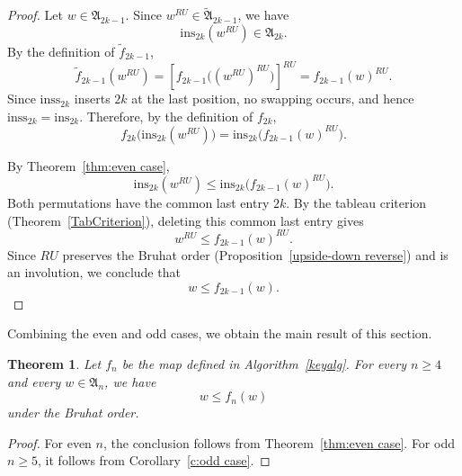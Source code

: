 \documentclass[12pt]{amsart}
\newtheorem{thm}{Theorem}[section]
\theoremstyle{definition}
\numberwithin{equation}{section}
\newcommand{\ins}[1]{\mathrm{ins}_{#1}}
\newcommand{\inss}[1]{\mathrm{inss}_{#1}}
\begin{document}
\begin{proof}
Let $w\in\mathfrak A_{2k-1}$. Since
$w^{RU}\in\widetilde{\mathfrak A}_{2k-1}$, we have
\begin{equation*}
\ins{2k}(w^{RU})\in\mathfrak A_{2k}.
\end{equation*}
By the definition of $\widetilde f_{2k-1}$,
\begin{equation*}
\widetilde f_{2k-1}(w^{RU})
=
\left[f_{2k-1}\bigl((w^{RU})^{RU}\bigr)\right]^{RU}
=
f_{2k-1}(w)^{RU}.
\end{equation*}
Since $\inss{2k}$ inserts $2k$ at the last position, no swapping occurs,
and hence $\inss{2k}=\ins{2k}$. Therefore, by the definition of
$f_{2k}$,
\begin{equation*}
f_{2k}\bigl(\ins{2k}(w^{RU})\bigr)
=
\ins{2k}\bigl(f_{2k-1}(w)^{RU}\bigr).
\end{equation*}

By Theorem~\ref{thm:even case},
\begin{equation*}
\ins{2k}(w^{RU})
\leq
\ins{2k}\bigl(f_{2k-1}(w)^{RU}\bigr).
\end{equation*}
Both permutations have the common last entry $2k$. By the tableau criterion (Theorem~\ref{TabCriterion}), deleting this common last entry gives
\begin{equation*}
w^{RU}\leq f_{2k-1}(w)^{RU}.
\end{equation*}
Since $RU$ preserves the Bruhat order (Proposition~\ref{upside-down reverse}) and is an involution, we conclude
that
\begin{equation*}
w\leq f_{2k-1}(w).
\end{equation*}
\end{proof}

Combining the even and odd cases, we obtain the main result of this section.

\begin{thm}\label{t:Bruhat balance case}
Let $f_n$ be the map defined in Algorithm~\ref{keyalg}. For every $n\geq 4$ and every $w\in\mathfrak A_n$, we have
\begin{equation*}
w\leq f_n(w)
\end{equation*}
under the Bruhat order.
\end{thm}

\begin{proof}
    For even \(n\), the conclusion follows from Theorem~\ref{thm:even case}. For odd \(n\ge5\), it follows from Corollary~\ref{c:odd case}.
\end{proof}
\end{document}

